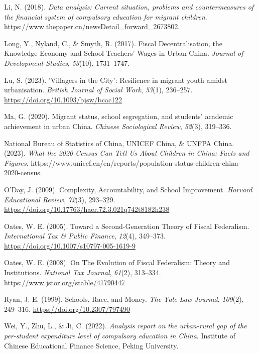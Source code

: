 \documentclass[
  man,
  floatsintext,
  longtable,
  nolmodern,
  notxfonts,
  notimes,
  colorlinks=true,linkcolor=blue,citecolor=blue,urlcolor=blue]{apa7}
\newlength{\cslhangindent}
\newenvironment{CSLReferences}[2] %
 {\begin{list}{}{%
  \setlength{\itemindent}{0pt}
  \setlength{\leftmargin}{0pt}
  \setlength{\parsep}{0pt}
  \ifodd #1
   \setlength{\leftmargin}{\cslhangindent}
   \setlength{\itemindent}{-1\cslhangindent}
  \fi
  \setlength{\itemsep}{#2\baselineskip}}}
 {\end{list}}
\begin{document}
\begin{CSLReferences}{1}{0}
Li, N. (2018). \emph{{Data analysis: Current situation, problems and
countermeasures of the financial system of compulsory education for
migrant children}}.
https://www.thepaper.cn/newsDetail\_forward\_2673802.

Long, Y., Nyland, C., \& Smyth, R. (2017). Fiscal {Decentralisation},
the {Knowledge Economy} and {School Teachers}' {Wages} in {Urban China}.
\emph{Journal of Development Studies}, \emph{53}(10), 1731--1747.

Lu, S. (2023). '{Villagers} in the {City}': {Resilience} in migrant
youth amidst urbanisation. \emph{British Journal of Social Work},
\emph{53}(1), 236--257. \url{https://doi.org/10.1093/bjsw/bcac122}

Ma, G. (2020). Migrant status, school segregation, and students'
academic achievement in urban {China}. \emph{Chinese Sociological
Review}, \emph{52}(3), 319--336.

National Bureau of Statistics of China, UNICEF China, \& UNFPA China.
(2023). \emph{What the 2020 {Census Can Tell Us About Children} in
{China}: {Facts} and {Figures}}.
https://www.unicef.cn/en/reports/population-status-children-china-2020-census.

O'Day, J. (2009). Complexity, {Accountability}, and {School
Improvement}. \emph{Harvard Educational Review}, \emph{72}(3), 293--329.
\url{https://doi.org/10.17763/haer.72.3.021q742t8182h238}

Oates, W. E. (2005). Toward a {Second-Generation Theory} of {Fiscal
Federalism}. \emph{International Tax \& Public Finance}, \emph{12}(4),
349--373. \url{https://doi.org/10.1007/s10797-005-1619-9}

Oates, W. E. (2008). On {The Evolution} of {Fiscal Federalism}: {Theory}
and {Institutions}. \emph{National Tax Journal}, \emph{61}(2), 313--334.
\url{https://www.jstor.org/stable/41790447}

Ryan, J. E. (1999). Schools, {Race}, and {Money}. \emph{The Yale Law
Journal}, \emph{109}(2), 249--316. \url{https://doi.org/10.2307/797490}

Wei, Y., Zhu, L., \& Ji, C. (2022). \emph{Analysis report on the
urban-rural gap of the per-student expenditure level of compulsory
education in {China}}. Institute of Chinese Educational Finance Science,
Peking University.

\end{CSLReferences}
\end{document}
